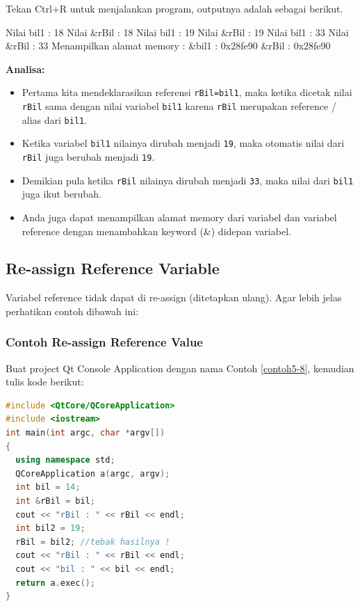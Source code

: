 Tekan Ctrl+R untuk menjalankan program, outputnya adalah sebagai
berikut.

\begin{lcverbatim}
Nilai bil1 : 18
Nilai &rBil : 18
Nilai bil1 : 19
Nilai &rBil : 19
Nilai bil1 : 33
Nilai &rBil : 33
Menampilkan alamat memory :
&bil1 : 0x28fe90
&rBil : 0x28fe90
\end{lcverbatim}

\textbf{Analisa:}

\begin{itemize}

\item
  Pertama kita mendeklarasikan referensi \texttt{rBil=bil1}, maka ketika
  dicetak nilai \texttt{rBil} sama dengan nilai variabel \texttt{bil1}
  karena \texttt{rBil} merupakan reference / alias dari \texttt{bil1}.
\item
  Ketika variabel \texttt{bil1} nilainya dirubah menjadi \texttt{19},
  maka otomatis nilai dari \texttt{rBil} juga berubah menjadi
  \texttt{19}.
\item
  Demikian pula ketika \texttt{rBil} nilainya dirubah menjadi
  \texttt{33}, maka nilai dari \texttt{bil1} juga ikut berubah.
\item
  Anda juga dapat menampilkan alamat memory dari variabel dan variabel
  reference dengan menambahkan keyword (\&) didepan variabel.
\end{itemize}

\subsection{Re-assign Reference
Variable}\label{re-assign-reference-variable}

Variabel reference tidak dapat di re-assign (ditetapkan ulang). Agar
lebih jelas perhatikan contoh dibawah ini:

\subsubsection*{Contoh  Re-assign Reference Value}

Buat project Qt Console Application dengan nama Contoh \ref{contoh5-8}, kemudian tulis
kode berikut:

\begin{lstlisting}[language=c++, caption=Re-assign Reference Value, label=contoh5-8]
#include <QtCore/QCoreApplication>
#include <iostream>
int main(int argc, char *argv[])
{
  using namespace std;
  QCoreApplication a(argc, argv);
  int bil = 14;
  int &rBil = bil;
  cout << "rBil : " << rBil << endl;
  int bil2 = 19;
  rBil = bil2; //tebak hasilnya !
  cout << "rBil : " << rBil << endl;
  cout << "bil : " << bil << endl;
  return a.exec();
}
\end{lstlisting}

